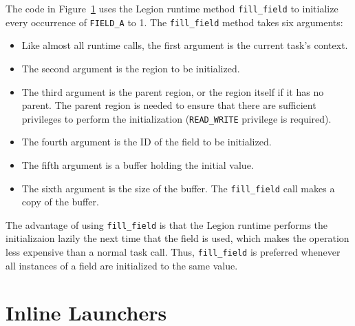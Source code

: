 \begin{figure}
  
\caption{}
\label{fig:fill}
\end{figure}
The code in Figure~\ref{fig:fill} uses the Legion runtime method {\tt fill\_field} to initialize every 
occurrence of {\tt FIELD\_A} to 1.  The {\tt fill\_field} method takes six arguments:

\begin{itemize}

\item Like almost all runtime calls, the first argument is the current task's context.

\item The second argument is the region to be initialized.

\item The third argument is the parent region, or the region itself if it has no parent.  The parent region is needed
to ensure that there are sufficient privileges to perform the initialization ({\tt READ\_WRITE} privilege
is required).

\item The fourth argument is the ID of the field to be initialized.

\item The fifth argument is a buffer holding the initial value.

\item The sixth argument is the size of the buffer.  
The {\tt fill\_field} call makes a copy of the buffer.

\end{itemize}

The advantage of using {\tt fill\_field} is that the Legion runtime performs the initializaion lazily the next time that
the field is used, which makes the operation less expensive than a normal task call.  Thus, {\tt fill\_field} is preferred
whenever all instances of a field are initialized to the same value.


\section{Inline Launchers}
\label{sec:inlinelaunch}

